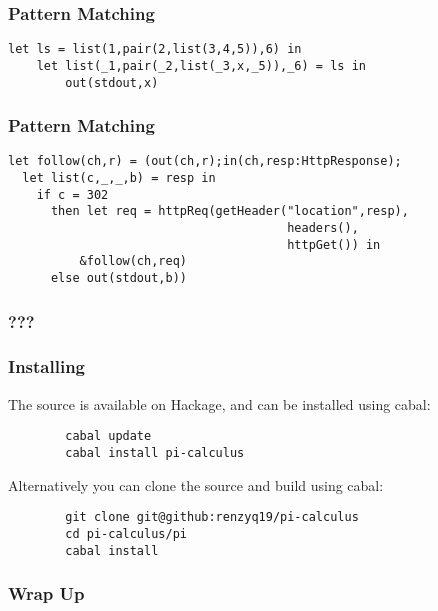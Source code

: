 \documentclass[t]{beamer}
\begin{document}
\begin{frame}[fragile]
\frametitle{Pattern Matching}
\begin{verbatim}
let ls = list(1,pair(2,list(3,4,5)),6) in 
    let list(_1,pair(_2,list(_3,x,_5)),_6) = ls in 
        out(stdout,x)
\end{verbatim}
\end{frame}

\begin{frame}[fragile]
\frametitle{Pattern Matching}
\begin{verbatim}
let follow(ch,r) = (out(ch,r);in(ch,resp:HttpResponse);
  let list(c,_,_,b) = resp in
    if c = 302 
      then let req = httpReq(getHeader("location",resp),
                                       headers(),
                                       httpGet()) in 
          &follow(ch,req) 
      else out(stdout,b)) 
\end{verbatim}
\end{frame}

\begin{frame}
\frametitle{???}
\end{frame}

\begin{frame}[fragile]
\frametitle{Installing}

    The source is available on Hackage, and can be installed using cabal:
    \begin{verbatim}
        cabal update
        cabal install pi-calculus
    \end{verbatim}

    Alternatively you can clone the source and build using cabal:

    \begin{verbatim}
        git clone git@github:renzyq19/pi-calculus
        cd pi-calculus/pi
        cabal install
    \end{verbatim}
\end{frame}

\begin{frame}
\frametitle{Wrap Up}
\end{frame}
\end{document}
